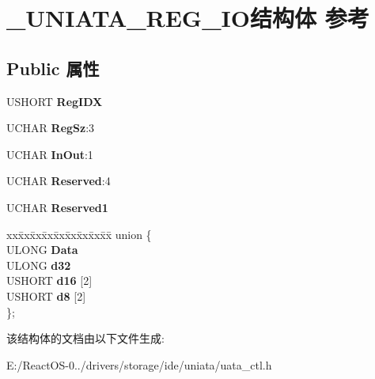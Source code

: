 \hypertarget{struct___u_n_i_a_t_a___r_e_g___i_o}{}\section{\+\_\+\+U\+N\+I\+A\+T\+A\+\_\+\+R\+E\+G\+\_\+\+I\+O结构体 参考}
\label{struct___u_n_i_a_t_a___r_e_g___i_o}
\subsection*{Public 属性}
\begin{DoxyCompactItemize}
\item 
\mbox{\label{struct___u_n_i_a_t_a___r_e_g___i_o_ac84343624e7eb48fbb82159a26b38399}} 
U\+S\+H\+O\+RT {\bfseries Reg\+I\+DX}
\item 
\mbox{\label{struct___u_n_i_a_t_a___r_e_g___i_o_af733e30cafd503670e45bf77925dd01e}} 
U\+C\+H\+AR {\bfseries Reg\+Sz}\+:3
\item 
\mbox{\label{struct___u_n_i_a_t_a___r_e_g___i_o_a983771e5f2891a84c608d199881727f2}} 
U\+C\+H\+AR {\bfseries In\+Out}\+:1
\item 
\mbox{\label{struct___u_n_i_a_t_a___r_e_g___i_o_ac3cf652caf5dda2947856be67a81bc82}} 
U\+C\+H\+AR {\bfseries Reserved}\+:4
\item 
\mbox{\label{struct___u_n_i_a_t_a___r_e_g___i_o_a47533af4cfdb4e67c1ca170aacf11020}} 
U\+C\+H\+AR {\bfseries Reserved1}
\item 
\mbox{\label{struct___u_n_i_a_t_a___r_e_g___i_o_a41579a90e3c563ea908ef149e5cb3424}} 
\begin{tabbing}
xx\=xx\=xx\=xx\=xx\=xx\=xx\=xx\=xx\=\kill
union \{\\
\>ULONG {\bfseries Data}\\
\>ULONG {\bfseries d32}\\
\>USHORT {\bfseries d16} \mbox{[}2\mbox{]}\\
\>USHORT {\bfseries d8} \mbox{[}2\mbox{]}\\
\}; \\

\end{tabbing}\end{DoxyCompactItemize}


该结构体的文档由以下文件生成\+:\begin{DoxyCompactItemize}
\item 
E\+:/\+React\+O\+S-\/0../drivers/storage/ide/uniata/uata\+\_\+ctl.\+h\end{DoxyCompactItemize}
